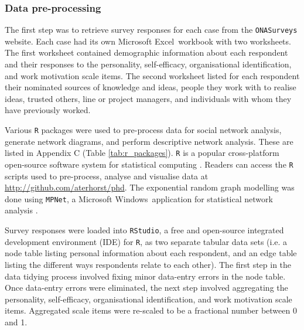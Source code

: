 \subsubsection{Data pre-processing}

The first step was to retrieve survey responses for each case from the \texttt{ONASurveys} website. Each case had its own Microsoft Excel\texttrademark\ workbook with two worksheets. The first worksheet contained demographic information about each respondent and their responses to the personality, self-efficacy, organisational identification, and work motivation scale items. The second worksheet listed for each respondent their nominated sources of knowledge and ideas, people they work with to realise ideas, trusted others, line or project managers, and individuals with whom they have previously worked. \medskip

Various \texttt{R} packages were used to pre-process data for social network analysis, generate network diagrams, and perform descriptive network analysis. These are listed in Appendix C (Table \ref{tab:r_packages}). \texttt{R} is a popular cross-platform open-source software system for statistical computing \citep{core2018r}. Readers can access the \texttt{R} scripts used to pre-process, analyse and visualise data at \url{http://github.com/aterhorst/phd}. The exponential random graph modelling was done using \texttt{MPNet}, a Microsoft Windows\texttrademark\ application for statistical network analysis \citep{wang2014mpnet}. \medskip

Survey responses were loaded into \texttt{RStudio}, a free and open-source integrated development environment (IDE) for \texttt{R}, as two separate tabular data sets (i.e. a node table listing personal information about each respondent, and an edge table listing the different ways respondents relate to each other). The first step in the data tidying process involved fixing minor data-entry errors in the node table. Once data-entry errors were eliminated, the next step involved aggregating the personality, self-efficacy, organisational identification, and work motivation scale items. Aggregated scale items were re-scaled to be a fractional number between 0 and 1. \medskip

